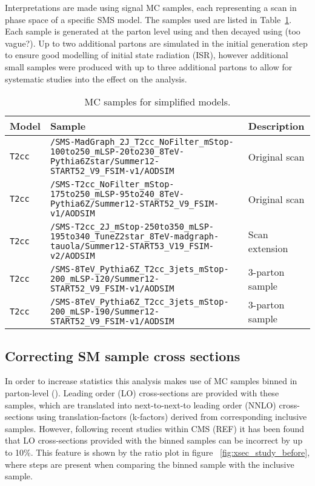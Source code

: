 Interpretations are made using signal MC samples, each representing a scan in 
phase space of a specific SMS model. The samples used are listed in
Table~\ref{tab:mc-signal}. Each sample is generated at the parton level using \MADGRAPH and then
decayed using \PYTHIA (too vague?). Up to two additional partons are simulated 
in the initial generation step to ensure good modelling of initial state 
radiation (ISR), however additional small samples were produced with up to three
additional partons to allow for systematic studies into the effect on the 
analysis.

\begin{landscape}
  \begin{center}
    \begin{table}[ht]
      \caption{MC samples for simplified models.}
      \label{tab:mc-signal}
      \centering
      \tiny
      \begin{tabular}{ lll }
        \hline
        Model & Sample & Description \\
        \hline
        \hline
        \verb!T2cc! & \verb!/SMS-MadGraph_2J_T2cc_NoFilter_mStop-100to250_mLSP-20to230_8TeV-Pythia6Zstar/Summer12-START52_V9_FSIM-v1/AODSIM! & Original scan \\
        \verb!T2cc! & \verb!/SMS-T2cc_NoFilter_mStop-175to250_mLSP-95to240_8TeV-Pythia6Z/Summer12-START52_V9_FSIM-v1/AODSIM! & Original scan \\
        \verb!T2cc! & \verb!/SMS-T2cc_2J_mStop-250to350_mLSP-195to340_TuneZ2star_8TeV-madgraph-tauola/Summer12-START53_V19_FSIM-v2/AODSIM! & Scan extension \\
        \verb!T2cc! & \verb!/SMS-8TeV_Pythia6Z_T2cc_3jets_mStop-200_mLSP-120/Summer12-START52_V9_FSIM-v1/AODSIM! & 3-parton sample \\
        \verb!T2cc! & \verb!/SMS-8TeV_Pythia6Z_T2cc_3jets_mStop-200_mLSP-190/Summer12-START52_V9_FSIM-v1/AODSIM! & 3-parton sample \\
        \hline
        \hline
      \end{tabular}
    \end{table}
  \end{center}
\end{landscape}

\subsection{Correcting SM sample cross sections}
\label{sec:mc_xsec_corrs}
In order to increase statistics this analysis makes use of MC samples binned in 
parton-level \HT (\HTpart). Leading order (LO) cross-sections are provided with 
these samples, which are translated into next-to-next-to leading order (NNLO) 
cross-sections using translation-factors (k-factors) derived from corresponding 
inclusive samples. However, following recent studies within CMS (REF) it has 
been found that LO cross-sections provided with the \HTpart binned samples can 
be incorrect by up to 10\%. This feature is shown by the ratio plot in figure~
\ref{fig:xsec_study_before}, where steps are present when comparing the \zj binned
sample with the \dyj inclusive sample.

